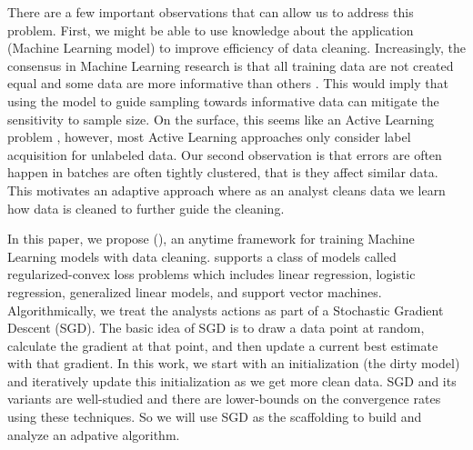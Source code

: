 There are a few important observations that can allow us to address this problem.
First, we might be able to use knowledge about the application (Machine Learning model) to improve efficiency of data cleaning.
Increasingly, the consensus in Machine Learning research is that all training data are not created equal and some data are more informative than others \cite{drineas2012fast, settles2010active}.
This would imply that using the model to guide sampling towards informative data can mitigate the sensitivity to sample size.
On the surface, this seems like an Active Learning problem \cite{settles2010active}, however, most Active Learning approaches only consider label acquisition for unlabeled data. 
Our second observation is that errors are often happen in batches are often tightly clustered, that is they affect similar data.
This motivates an adaptive approach where as an analyst cleans data we learn how data is cleaned to further guide the cleaning.

In this paper, we propose \sysfull (\sys), an anytime framework for training Machine Learning models with data cleaning.
\sys supports a class of models called regularized-convex loss problems which includes linear regression, logistic regression, generalized linear models, and support vector machines.
Algorithmically, we treat the analysts actions as part of a Stochastic Gradient Descent (SGD).
The basic idea of SGD is to draw a data point at random, calculate the gradient at that point, and then update a current best estimate with that gradient.
In this work, we start with an initialization (the dirty model) and iteratively update this initialization as we get more clean data. 
SGD and its variants are well-studied and there are lower-bounds on the convergence rates using these techniques. So we will use SGD as the scaffolding to build and analyze an adpative algorithm. 










